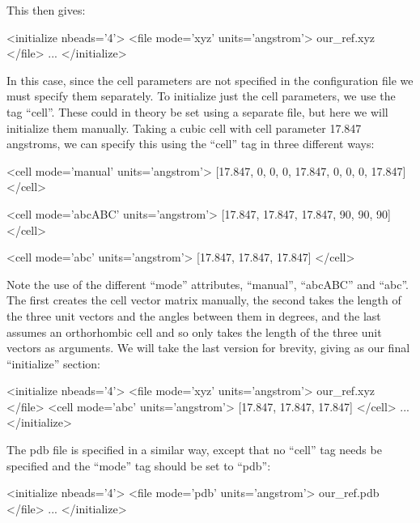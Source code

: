 \documentclass[11pt,english,fleqn]{report}
\newenvironment{code}{%
\footnotesize 
\verbatim
}{
\endverbatim
\normalsize
}
\begin{document}
This then gives:

\begin{code}
<initialize nbeads='4'>
   <file mode='xyz' units='angstrom'> our_ref.xyz </file>
   ...
</initialize>
\end{code}

In this case, since the cell parameters are not specified in the
configuration file we must specify them separately. 
To initialize just the cell parameters, we use the tag {}``cell''.
These could in theory be set using a separate
file, but here we will initialize them manually. Taking a cubic cell
with cell parameter 17.847 angstroms, we can specify this using
the {}``cell'' tag in three different ways:

\begin{code}
<cell mode='manual' units='angstrom'> 
   [17.847, 0, 0, 0, 17.847, 0, 0, 0, 17.847] 
</cell>
\end{code}

\begin{code}
<cell mode='abcABC' units='angstrom'>
   [17.847, 17.847, 17.847, 90, 90, 90]
</cell>
\end{code}

\begin{code}
<cell mode='abc' units='angstrom'>
   [17.847, 17.847, 17.847]
</cell>
\end{code}

Note the use of the different {}``mode'' attributes, {}``manual'',
{}``abcABC'' and {}``abc''. The first creates the cell vector
matrix manually, the second takes the length of the three unit vectors
and the angles between them in degrees, and the last assumes an orthorhombic
cell and so only takes the length of the three unit vectors as arguments.
We will take the last version for brevity, giving as our final {}``initialize''
section:

\begin{code}
<initialize nbeads='4'>
   <file mode='xyz' units='angstrom'> our_ref.xyz </file>
   <cell mode='abc' units='angstrom'>
      [17.847, 17.847, 17.847]
   </cell>
   ...
</initialize>
\end{code}

The pdb file is specified in a similar way, except that no {}``cell''
tag needs be specified and the {}``mode'' tag should be
set to {}``pdb'':

\begin{code}
<initialize nbeads='4'>
   <file mode='pdb' units='angstrom'> our_ref.pdb </file>
   ...
</initialize>
\end{code}
\end{document}
